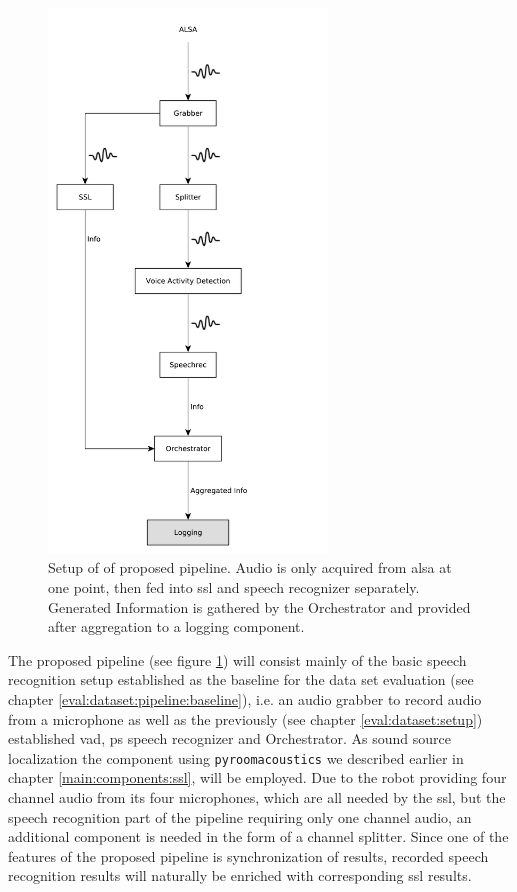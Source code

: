 \begin{figure}[]
	\centering
	\includegraphics[width=0.66\textwidth]{diagrams/eval_task_proposed.pdf}
	\caption{Setup of of proposed pipeline.
		Audio is only acquired from \gls{alsa} at one point, then fed into \gls{ssl} and speech recognizer separately.
		Generated Information is gathered by the Orchestrator and provided after aggregation to a logging component.}
	\label{pic:eval_task_setup_new}
\end{figure}

The proposed pipeline (see figure \ref{pic:eval_task_setup_new}) will consist mainly of the basic speech recognition setup established as the baseline for the data set evaluation (see chapter \ref{eval:dataset:pipeline:baseline}), i.e. an audio grabber to record audio from a microphone as well as the previously (see chapter \ref{eval:dataset:setup}) established \gls{vad}, \gls{ps} speech recognizer and Orchestrator.
As sound source localization the component using \texttt{pyroomacoustics} we described earlier in chapter \ref{main:components:ssl}, will be employed.
Due to the robot providing four channel audio from its four microphones, which are all needed by the \gls{ssl}, but the speech recognition part of the pipeline requiring only one channel audio, an additional component is needed in the form of a channel splitter.
Since one of the features of the proposed pipeline is synchronization of results, recorded speech recognition results will naturally be enriched with corresponding \gls{ssl} results.

